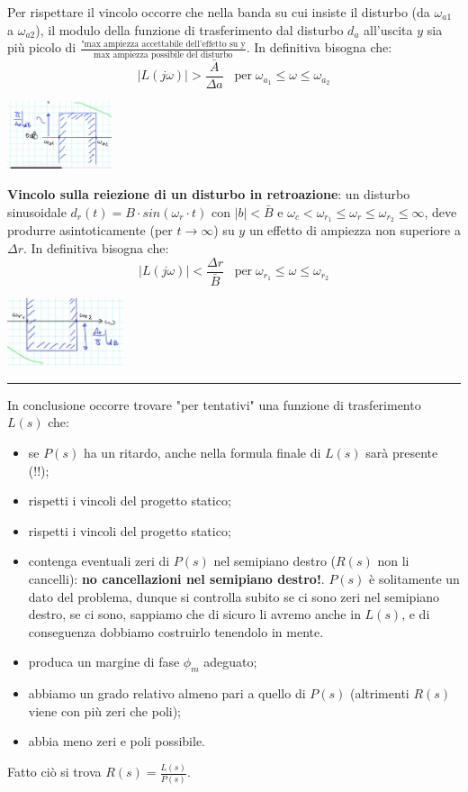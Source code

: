     Per rispettare il vincolo occorre che nella banda su cui insiste il disturbo (da $\omega_{a1}$ a $\omega_{a2}$), il modulo della funzione di trasferimento dal disturbo $d_a$ all'uscita $y$ sia più picolo di $\frac{\text{"max ampiezza accettabile dell'effetto su y}}{\text{max ampiezza possibile del disturbo}}$.\newline
    In definitiva bisogna che:
    \[
        |L(j \omega)| > \frac{\bar{A}}{\Delta a} \;\;\;\text{per}\; \omega_{a_1} \leq \omega \leq \omega_{a_2}
    \]
    \begin{center}
        \includegraphics[height=2cm]{../formulario/img8.JPG}
    \end{center}
    \textbf{Vincolo sulla reiezione di un disturbo in retroazione}: un disturbo sinusoidale $d_r(t) = B \cdot  sin(\omega_r \cdot t)$ con $|b| < \bar{B}$ e $\omega_c < \omega_{r_1} \leq \omega_r \leq \omega_{r_2} \leq \infty$, deve produrre asintoticamente (per $t \rightarrow  \infty$) su $y$ un effetto di ampiezza non superiore a $\Delta r$. In definitiva bisogna che:
    \[
        |L(j \omega)| < \frac{\Delta r }{\bar{B}} \;\;\;\text{per}\; \omega_{r_1} \leq \omega \leq \omega_{r_2}
    \]
    \begin{center}
        \includegraphics[height=2cm]{../formulario/img9.JPG}
    \end{center}
    \rule{\textwidth}{0,4pt}
    In conclusione occorre trovare "per tentativi" una funzione di trasferimento $L(s)$ che:
    \begin{itemize}
        \item se $P(s)$ ha un ritardo, anche nella formula finale di $L(s)$ sarà presente (!!);
        \item rispetti i vincoli del progetto statico;
        \item rispetti i vincoli del progetto statico;
        \item contenga eventuali zeri di $P(s)$ nel semipiano destro ($R(s)$ non li cancelli): \textbf{no cancellazioni nel semipiano destro!}. $P(s)$ è solitamente un dato del problema, dunque si controlla subito se ci sono zeri nel semipiano destro, se ci sono, sappiamo che di sicuro li avremo anche in $L(s)$, e di conseguenza dobbiamo costruirlo tenendolo in mente.
        \item produca un margine di fase $\phi_m$ adeguato;
        \item abbiamo un grado relativo almeno pari a quello di $P(s)$ (altrimenti $R(s)$ viene con più zeri che poli);
        \item abbia meno zeri e poli possibile.
    \end{itemize}
    Fatto ciò si trova $R(s) = \frac{L(s)}{P(s)}$.\newline

